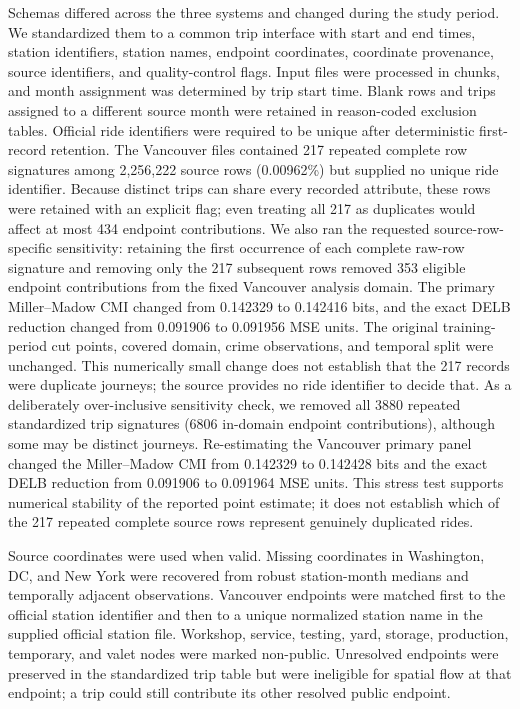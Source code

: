 \documentclass[applsci,article,accept,moreauthors]{Definitions/mdpi}
\begin{document}
Schemas differed across the three systems and changed during the study period.
We standardized them to a common trip interface with start and end times, station identifiers,
station names, endpoint coordinates, coordinate provenance, source
identifiers, and quality-control flags. Input files were processed in
chunks, and month assignment was determined by trip start time. Blank rows
and trips assigned to a different source month were retained in
reason-coded exclusion tables. Official ride identifiers were required to
be unique after deterministic first-record retention. {The Vancouver
files contained 217 repeated complete row signatures among 2,256,222 source
rows (0.00962\%) but supplied no unique ride identifier. Because distinct
trips can share every recorded attribute, these rows were retained with an
explicit flag; even treating all 217 as duplicates would affect at most 434
endpoint contributions.}
{We also ran the requested source-row-specific sensitivity: retaining the
first occurrence of each complete raw-row signature and removing only the
217 subsequent rows removed 353 eligible endpoint contributions from the
fixed Vancouver analysis domain. The primary Miller--Madow CMI changed from
0.142329 to 0.142416 bits, and the exact DELB reduction changed from
0.091906 to 0.091956 MSE units. The original training-period cut points,
covered domain, crime observations, and temporal split were unchanged. This
numerically small change does not establish that the 217 records were
duplicate journeys; the source provides no ride identifier to decide that.}
{As a deliberately over-inclusive sensitivity check, we removed all
3880 repeated standardized trip signatures (6806 in-domain endpoint
contributions), although some may be distinct journeys. Re-estimating the
Vancouver primary panel changed the Miller--Madow CMI from 0.142329 to
0.142428 bits and the exact DELB reduction from 0.091906 to 0.091964 MSE
units. This stress test supports numerical stability of the reported point
estimate; it does not establish which of the 217 repeated complete source
rows represent genuinely duplicated rides.}

Source coordinates were used when valid. Missing coordinates in Washington, DC, and
New York were recovered from robust station-month medians and
temporally adjacent observations. Vancouver endpoints were matched first
to the official station identifier and then to a unique normalized station
name in the supplied official station file. Workshop, service, testing,
yard, storage, production, temporary, and valet nodes were marked
non-public. Unresolved endpoints were preserved in the standardized trip
table but were ineligible for spatial flow at that endpoint; a trip could
still contribute its other resolved public endpoint.
\end{document}

